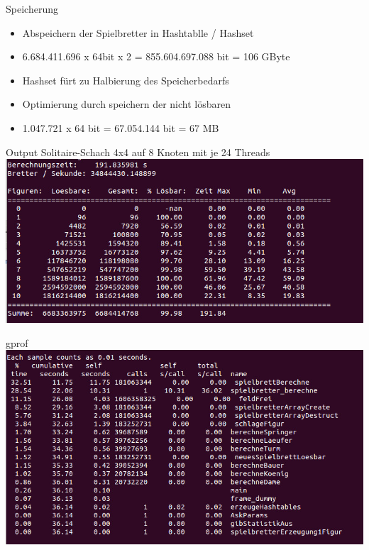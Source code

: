 \documentclass{beamer}
\begin{document}
\begin{frame}{Speicherung}
	\begin{itemize}
		\item Abspeichern der Spielbretter in Hashtablle / Hashset
		\item 6.684.411.696 x 64bit x 2 = 855.604.697.088 bit = 106 GByte
		\item Hashset fürt zu Halbierung des Speicherbedarfs
		\item Optimierung durch speichern der nicht lösbaren 
		\item 1.047.721 x 64 bit = 67.054.144 bit = 67 MB 
	\end{itemize}
\end{frame}

\begin{frame}{Output Solitaire-Schach 4x4 auf 8 Knoten mit je 24 Threads}
\includegraphics[scale=0.4]{output}
\end{frame}

\begin{frame}{gprof}
\includegraphics[scale=0.4]{gprof}
\end{frame}
\end{document}
